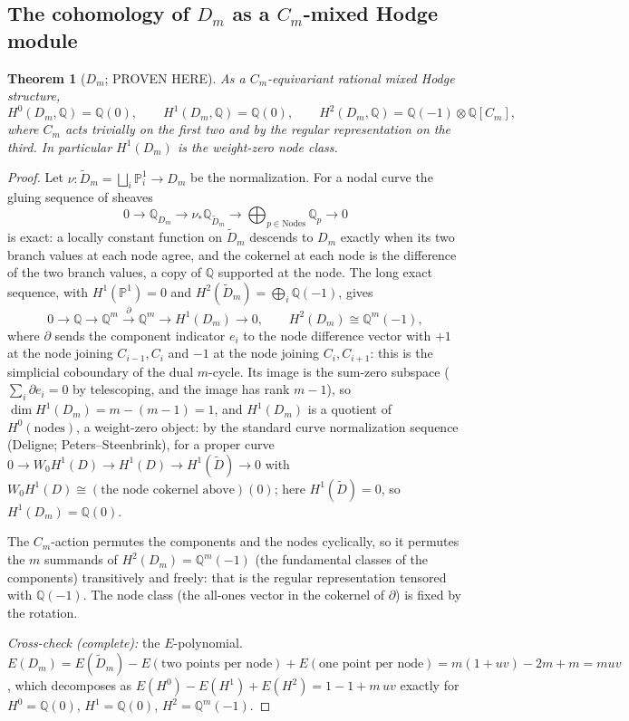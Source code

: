 \documentclass[11pt]{article}
\newtheorem{theorem}{Theorem}
\newcommand{\Q}{\mathbb Q}
\begin{document}
\subsection{The cohomology of $D_m$ as a $C_m$-mixed Hodge module}

\begin{theorem}[$D_m$; PROVEN HERE]
As a $C_m$-equivariant rational mixed Hodge structure,
\[
H^0(D_m,\Q)=\Q(0),\qquad
H^1(D_m,\Q)=\Q(0),\qquad
H^2(D_m,\Q)=\Q(-1)\otimes\Q[C_m],
\]
where $C_m$ acts trivially on the first two and by the regular
representation on the third. In particular $H^1(D_m)$ is the
\emph{weight-zero} node class.
\end{theorem}

\begin{proof}
Let $\nu\colon\tilde D_m=\bigsqcup_i \mathbb P^1_i\to D_m$ be the
normalization. For a nodal curve the gluing sequence of sheaves
\[
0\to\Q_{D_m}\to\nu_*\Q_{\tilde D_m}\to\bigoplus_{p\in\mathrm{Nodes}}\Q_p\to0
\]
is exact: a locally constant function on $\tilde D_m$ descends to
$D_m$ exactly when its two branch values at each node agree, and the
cokernel at each node is the difference of the two branch values, a copy
of $\Q$ supported at the node. The long exact sequence, with
$H^1(\mathbb P^1)=0$ and $H^2(\tilde D_m)=\bigoplus_i\Q(-1)$, gives
\[
0\to\Q\to\Q^m\xrightarrow{\ \partial\ }\Q^m\to H^1(D_m)\to0,
\qquad
H^2(D_m)\cong\Q^m(-1),
\]
where $\partial$ sends the component indicator $e_i$ to the node
difference vector with $+1$ at the node joining $C_{i-1},C_i$ and $-1$
at the node joining $C_i,C_{i+1}$: this is the simplicial coboundary of
the dual $m$-cycle. Its image is the sum-zero subspace
($\sum_i\partial e_i=0$ by telescoping, and the image has rank $m-1$),
so $\dim H^1(D_m)=m-(m-1)=1$, and $H^1(D_m)$ is a quotient of
$H^0(\text{nodes})$, a weight-zero object: by the standard curve
normalization sequence (Deligne; Peters--Steenbrink), for a proper
curve $0\to W_0H^1(D)\to H^1(D)\to H^1(\tilde D)\to0$ with
$W_0H^1(D)\cong(\text{the node cokernel above})(0)$; here
$H^1(\tilde D)=0$, so $H^1(D_m)=\Q(0)$.

The $C_m$-action permutes the components and the nodes cyclically, so
it permutes the $m$ summands of $H^2(D_m)=\Q^m(-1)$ (the fundamental
classes of the components) transitively and freely: that is the regular
representation tensored with $\Q(-1)$. The node class (the all-ones
vector in the cokernel of $\partial$) is fixed by the rotation.

\emph{Cross-check (complete):} the $E$-polynomial.
$E(D_m)=E(\tilde D_m)-E(\text{two points per node})+E(\text{one point
per node})=m(1+uv)-2m+m=muv$, which decomposes as
$E(H^0)-E(H^1)+E(H^2)=1-1+m\,uv$ exactly for
$H^0=\Q(0)$, $H^1=\Q(0)$, $H^2=\Q^m(-1)$.
\end{proof}
\end{document}
